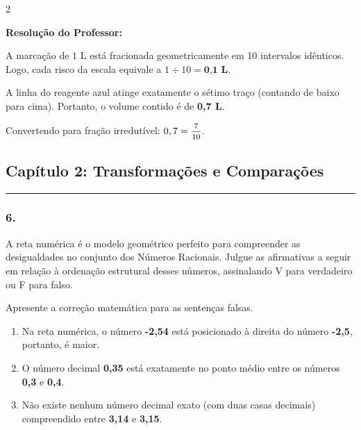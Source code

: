 \begin{multicols*}{2}
\ifgabarito
    \begin{tcolorbox}[colback=CorTitUm!5, colframe=CorTitUm, boxrule=1pt, arc=4pt, left=6pt, right=6pt, top=6pt, bottom=6pt]
    \small\textbf{\textcolor{CorTitUm}{Resolução do Professor:}}\par\vspace{0.1cm}
    \color{CinzaEscuro}
    A marcação de $1 \text{ L}$ está fracionada geometricamente em 10 intervalos idênticos. Logo, cada risco da escala equivale a $1 \div 10 = \textbf{0,1 L}$.
    
    A linha do reagente azul atinge exatamente o sétimo traço (contando de baixo para cima). Portanto, o volume contido é de \textbf{0,7 L}. 
    
    Convertendo para fração irredutível: $0,7 = \mfrac{7}{10}$.
    \end{tcolorbox}
\fi

\par\vspace{\espacoQuestao}

\subsection*{Capítulo 2: Transformações e Comparações}
\vspace{-0.2cm}\noindent\rule{\linewidth}{1.5pt} 
\par\vspace{\espacoPosTitulo}
\subsubsection*{6.} A reta numérica é o modelo geométrico perfeito para compreender as desigualdades no conjunto dos Números Racionais. Julgue as afirmativas a seguir em relação à ordenação estrutural desses números, assinalando V para verdadeiro ou F para falso.

Apresente a correção matemática para as sentenças falsas.
\begin{enumerate}[label=\Roman*., itemsep=\espacoAlt]
    \item Na reta numérica, o número \textbf{-2,54} está posicionado à direita do número \textbf{-2,5}, portanto, é maior.
    \item O número decimal \textbf{0,35} está exatamente no ponto médio entre os números \textbf{0,3} e \textbf{0,4}.
    \item Não existe nenhum número decimal exato (com duas casas decimais) compreendido entre \textbf{3,14} e \textbf{3,15}.
\end{enumerate}


\end{multicols*}
